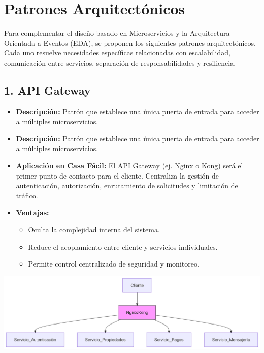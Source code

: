 \section{Patrones Arquitectónicos}
	\noindent Para complementar el diseño basado en Microservicios y la Arquitectura Orientada a Eventos (EDA), se proponen los siguientes patrones arquitectónicos. Cada uno resuelve necesidades específicas relacionadas con escalabilidad, comunicación entre servicios, separación de responsabilidades y resiliencia.
	
	\subsection*{1. API Gateway}
		\begin{itemize}
			\item \textbf{Descripción:} Patrón que establece una única puerta de entrada para acceder a múltiples microservicios.  
			\item \textbf{Descripción:} Patrón que establece una única puerta de entrada para acceder a múltiples microservicios.  
			\item \textbf{Aplicación en Casa Fácil:} El API Gateway (ej. Nginx o Kong) será el primer punto de contacto para el cliente. Centraliza la gestión de autenticación, autorización, enrutamiento de solicitudes y limitación de tráfico.  
			\item 	\textbf{Ventajas:}
			\begin{itemize}
				\item Oculta la complejidad interna del sistema.
				\item Reduce el acoplamiento entre cliente y servicios individuales.
				\item Permite control centralizado de seguridad y monitoreo.
			\end{itemize}
		\end{itemize}
		\begin{center}
			\includegraphics[width=\linewidth]{figures/patterns/APIG.png}
			\label{fig:img2}
		\end{center}
	
